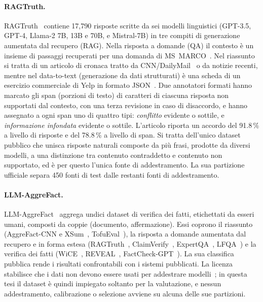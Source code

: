 \paragraph{RAGTruth.} RAGTruth~\cite{niu2024ragtruth} contiene 17{,}790 risposte scritte da sei modelli linguistici
(GPT-3.5, GPT-4, Llama-2 7B, 13B e 70B, e Mistral-7B) in tre compiti di generazione aumentata dal recupero (RAG). Nella
risposta a domande (QA) il contesto è un insieme di passaggi recuperati per una domanda di
MS~MARCO~\cite{nguyen2016msmarco}. Nel riassunto si tratta di un articolo di cronaca tratto da
CNN/DailyMail~\cite{hermann2015teaching,see2017pointer} o da notizie recenti, mentre nel data-to-text (generazione da
dati strutturati) è una scheda di un esercizio commerciale di Yelp in formato JSON~\cite{yelpdataset}. Due annotatori
formati hanno marcato gli span (porzioni di testo) di caratteri di ciascuna risposta non supportati dal contesto, con una
terza revisione in caso di disaccordo, e hanno assegnato a ogni span uno di quattro tipi: \emph{conflitto} evidente o
sottile, e \emph{informazione infondata} evidente o sottile. L'articolo riporta un accordo del 91.8\,\% a livello di
risposte e del 78.8\,\% a livello di span. Si tratta dell'unico dataset pubblico che unisca risposte naturali composte
da più frasi, prodotte da diversi modelli, a una distinzione tra contenuto contraddetto e contenuto non supportato, ed è
per questo l'unica fonte di addestramento. La sua partizione ufficiale separa 450 fonti di test dalle restanti fonti di
addestramento.

\paragraph{LLM-AggreFact.} LLM-AggreFact~\cite{tang2024minicheck,llmaggrefact} aggrega undici dataset di verifica dei
fatti, etichettati da esseri umani, composti da coppie (documento, affermazione). Essi coprono il riassunto
(AggreFact-CNN e XSum~\cite{tang2023aggrefact}, TofuEval~\cite{tang2024tofueval}), la risposta a domande aumentata dal
recupero e in forma estesa (RAGTruth~\cite{niu2024ragtruth}, ClaimVerify~\cite{liu2023verifiability},
ExpertQA~\cite{malaviya2024expertqa}, LFQA~\cite{chen2024lfqa}) e la verifica dei fatti (WiCE~\cite{kamoi2023wice},
REVEAL~\cite{jacovi2024reveal}, FactCheck-GPT~\cite{wang2024factcheckbench}). La sua classifica pubblica rende i
risultati confrontabili con i sistemi pubblicati. La licenza stabilisce che i dati non devono essere usati per
addestrare modelli~\cite{hf_llmaggrefact}; in questa tesi il dataset è quindi impiegato soltanto per la valutazione, e
nessun addestramento, calibrazione o selezione avviene su alcuna delle sue partizioni.

